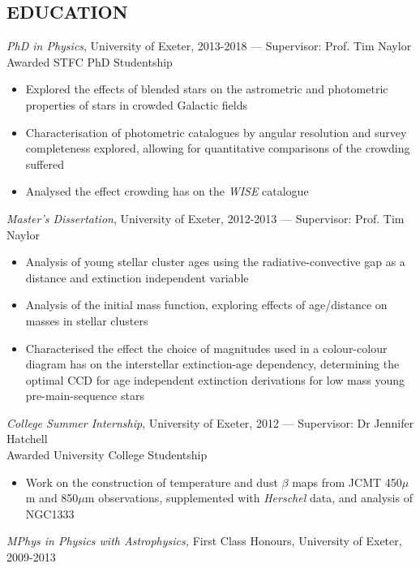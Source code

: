 \documentclass[letter, margin, 10pt]{res} %
\begin{document}
\begin{resume}
\section{EDUCATION}

{\sl PhD in Physics}, University of Exeter, 2013-2018 --- Supervisor: Prof. Tim Naylor\\
\null\quad\quad Awarded STFC PhD Studentship
\begin{itemize}[noitemsep,topsep=0pt,parsep=0pt,partopsep=0pt]
\item Explored the effects of blended stars on the astrometric and photometric properties of stars in crowded Galactic fields
\item Characterisation of photometric catalogues by angular resolution and survey completeness explored, allowing for quantitative comparisons of the crowding suffered
\item Analysed the effect crowding has on the \textit{WISE} catalogue
\end{itemize}
\vspace{-10pt}
{\sl Master's Dissertation}, University of Exeter, 2012-2013 --- Supervisor: Prof. Tim Naylor
\begin{itemize}[noitemsep,topsep=0pt,parsep=0pt,partopsep=0pt]
\item Analysis of young stellar cluster ages using the radiative-convective gap as a distance and extinction independent variable
\item Analysis of the initial mass function, exploring effects of age/distance on masses in stellar clusters
\item Characterised the effect the choice of magnitudes used in a colour-colour diagram has on the interstellar extinction-age dependency, determining the optimal CCD for age independent extinction derivations for low mass young pre-main-sequence stars
\end{itemize}
\vspace{-10pt}
{\sl College Summer Internship}, University of Exeter, 2012 --- Supervisor: Dr Jennifer Hatchell\\
\null\quad\quad Awarded University College Studentship
\begin{itemize}[noitemsep,topsep=0pt,parsep=0pt,partopsep=0pt]
\item Work on the construction of temperature and dust $\beta$ maps from JCMT 450$\mu$m and 850$\mu$m observations, supplemented with \textit{Herschel} data, and analysis of NGC1333
\end{itemize}
\vspace{-10pt}
{\sl MPhys in Physics with Astrophysics,} First Class Honours, University of Exeter, 2009-2013


\end{resume}
\end{document}
